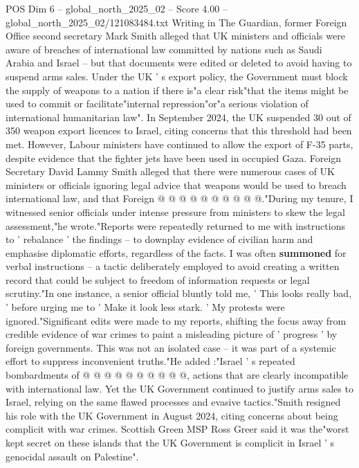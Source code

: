 \begin{textsample}{POS Dim 6 – global\_north\_2025\_02 – Score 4.00 – global\_north\_2025\_02/121083484.txt}  \label{ex:f6_pos_367}
Writing in The Guardian, former Foreign Office second secretary Mark Smith alleged that UK ministers and officials were aware of breaches of international law committed by nations such as Saudi Arabia and Israel -- but that documents were edited or deleted to avoid having to suspend arms sales.
Under the UK ' s export policy, the Government must block the supply of weapons to a nation if there is"a clear risk"that the items might be used to commit or facilitate"internal repression"or"a serious violation of international humanitarian law".
In September 2024, the UK suspended 30 out of 350 weapon export licences to Israel, citing concerns that this threshold had been met.
However, Labour ministers have continued to allow the export of F-35 parts, despite evidence that the fighter jets have been used in occupied Gaza.
Foreign Secretary David Lammy Smith alleged that there were numerous cases of UK ministers or officials ignoring legal advice that weapons would be used to breach international law, and that Foreign @ @ @ @ @ @ @ @ @ @."During my tenure, I witnessed senior officials under intense pressure from ministers to skew the legal assessment,"he wrote."Reports were repeatedly returned to me with instructions to ' rebalance ' the findings -- to downplay evidence of civilian harm and emphasise diplomatic efforts, regardless of the facts.
I was often \textbf{summoned} for verbal instructions -- a tactic deliberately employed to avoid creating a written record that could be subject to freedom of information requests or legal scrutiny."In one instance, a senior official bluntly told me, ' This looks really bad, ' before urging me to ' Make it look less stark. ' My protests were ignored."Significant edits were made to my reports, shifting the focus away from credible evidence of war crimes to paint a misleading picture of ' progress ' by foreign governments.
This was not an isolated case -- it was part of a systemic effort to suppress inconvenient truths."He added :"Israel ' s repeated bombardments of @ @ @ @ @ @ @ @ @ @, actions that are clearly incompatible with international law.
Yet the UK Government continued to justify arms sales to Israel, relying on the same flawed processes and evasive tactics."Smith resigned his role with the UK Government in August 2024, citing concerns about being complicit with war crimes.
Scottish Green MSP Ross Greer said it was the"worst kept secret on these islands that the UK Government is complicit in Israel ' s genocidal assault on Palestine".

\end{textsample}
